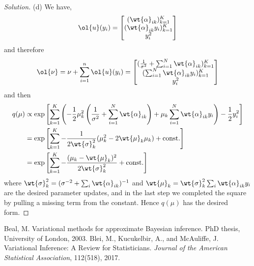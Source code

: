\documentclass{article}
\newenvironment{solution}{\begin{proof}[Solution]}{\end{proof}}
\begin{document}
\begin{solution}
(d) We have,
\[
\ol{u}(y_i) = \begin{bmatrix} (\wt{\alpha}_{ik})_{k=1}^K \\ (\wt{\alpha}_{ik}y_i)_{k=1}^K \\ y_i^2 \end{bmatrix}
\]
and therefore
\[
\ol{\nu} = \nu + \sum_{i=1}^n \ol{u}(y_i) = \begin{bmatrix} (\frac{1}{\sigma^2} + \sum_{i=1}^N \wt{\alpha}_{ik})_{k=1}^K \\ (\sum_{i=1}^N \wt{\alpha}_{ik} y_i)_{k=1}^K \\ y_i^2 \end{bmatrix}
\]
and then
\begin{align*}
q(\mu) &\propto \exp\left[ \sum_{k=1}^K \left( -\frac{1}{2} \mu_k^2 \left(\frac{1}{\sigma^2} + \sum_{i=1}^N \wt{\alpha}_{ik}\right) + \mu_k \sum_{i=1}^N \wt{\alpha}_{ik} y_i \right) - \frac{1}{2} y_i^2 \right] \\
&= \exp\left[ \sum_{k=1}^K -\frac{1}{2\wt{\sigma}^2_k} (\mu_k^2 - 2\wt{\mu}_k \mu_k) + \text{const.} \right] \\
&= \exp\left[ \sum_{k=1}^K -\frac{(\mu_k - \wt{\mu}_k)^2}{2\wt{\sigma}^2_k} + \text{const.} \right]
\end{align*}
where $\wt{\sigma}^2_k = (\sigma^{-2} + \sum_i \wt{\alpha}_{ik})^{-1}$ and $\wt{\mu}_k = \wt{\sigma}^2_k \sum_i \wt{\alpha}_{ik} y_i$ are the desired parameter updates, and in the last step we completed the square by pulling a missing term from the constant. Hence $q(\mu)$ has the desired form.
\end{solution}

\begin{thebibliography}{99}
  Beal, M. Variational methods for approximate Bayesian inference. PhD thesis, University of London, 2003.
  Blei, M., Kucukelbir, A., and McAuliffe, J. Variational Inference: A Review for Statisticians. \textit{ Journal of the American Statistical Association}, 112(518), 2017.
\end{thebibliography}
\end{document}
